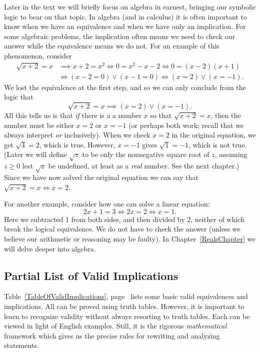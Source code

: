Later in the text we will briefly focus on algebra in earnest, bringing
our symbolic logic to bear on that topic.
In algebra (and in calculus) it is often important to know
when we have an equivalence and when we have only an implication.
For some  algebraic problems, the implication often means
we need to check our answer while the equivalence means
we do not.  For an example of this phenomenon, consider
\begin{align*}\sqrt{x+2}=x&\implies x+2=x^2\iff 0=x^2-x-2
                        \iff 0=(x-2)(x+1)\\
   &\iff(x-2=0)\vee(x-1=0)\iff(x=2)\vee(x=-1).\end{align*}
We lost the  equivalence at the first step, and
so we can only conclude from the logic that 
$$\sqrt{x+2}=x\implies(x=2)\vee(x=-1).$$
All this tells us is that {\it if} there is a a number $x$ so
that  $\sqrt{x+2}=x$, then
the number must be either $x=2$ or $x=-1$ (or perhaps both work; 
recall that we always interpret {\it or} inclusively).
When we check $x=2$ in the original equation, we get $\sqrt4=2$,
which is true.  However, $x=-1$ gives $\sqrt1=-1$, which is
not true.  (Later we will define $\sqrt{z}$ to be only the nonnegative 
square root of $z$, assuming $z\ge0$ lest $\sqrt{z}$ be undefined,
at least as a {\it real} number.  See the next chapter.)
Since we have now solved the original equation we can
say that $\sqrt{x+2}=x\iff x=2$.

For another example, consider how one can solve a linear equation:
$$2x+1=3\iff 2x=2\iff x=1.$$
Here we subtracted 1 from both sides, and then divided by 2, neither
of which break the logical equivalence. We do not have to check the answer
(unless we believe our arithmetic or reasoning may be faulty).
In Chapter~\ref{RealsChapter} we will delve deeper into algebra.

  
\subsection{Partial List of Valid Implications
\label{ValidImplicationsSubsection}} 
Table~\ref{TableOfValidImplications}, 
page~\pageref{TableOfValidImplications}
lists some  basic valid equivalences and implications.
All can be proved using truth tables.  However, it is important
to learn to recognize validity without always resorting
to truth tables. Each can be viewed in light of English
examples.     Still, it is the
rigorous {\it mathematical} framework which gives us the 
precise rules for rewriting and
analyzing statements.\footnotemark
{}

